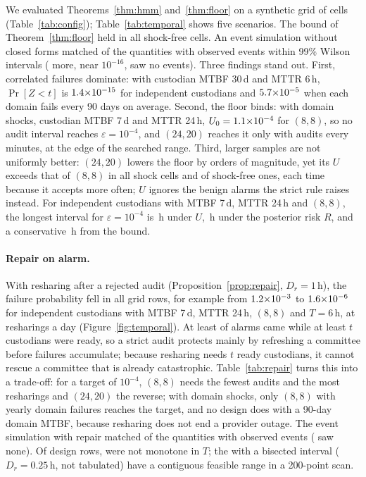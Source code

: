 \documentclass[Crown,sagev]{sagej}
\theoremstyle{plain}
\theoremstyle{definition}
\theoremstyle{remark}
\begin{document}
We evaluated Theorems~\ref{thm:hmm} and~\ref{thm:floor} on a synthetic grid of \TmpGridCells{} cells (Table~\ref{tab:config}); Table~\ref{tab:temporal} shows five scenarios. The bound of Theorem~\ref{thm:floor} held in all \TmpBoundCells{} shock-free cells. An event simulation without closed forms matched \TmpSimInfoPass{} of the \TmpSimInfo{} quantities with observed events within 99\% Wilson intervals (\TmpSimVacuous{} more, near $10^{-16}$, saw no events). Three findings stand out. First, correlated failures dominate: with custodian MTBF 30\,d and MTTR 6\,h, $\Pr[Z<t]$ is $1.4{\times}10^{-15}$ for independent custodians and $5.7{\times}10^{-5}$ when each domain fails every 90 days on average. Second, the floor binds: with domain shocks, custodian MTBF 7\,d and MTTR 24\,h, $U_0=1.1{\times}10^{-4}$ for $(8,8)$, so no audit interval reaches $\varepsilon=10^{-4}$, and $(24,20)$ reaches it only with audits every \TmpHardWideMin{} minutes, at the edge of the searched range. Third, larger samples are not uniformly better: $(24,20)$ lowers the floor by orders of magnitude, yet its $U$ exceeds that of $(8,8)$ in all \TmpShockTotal{} shock cells and \TmpIidWorse{} of \TmpIidTotal{} shock-free ones, each time because it accepts more often; $U$ ignores the benign alarms the strict rule raises instead. For independent custodians with MTBF 7\,d, MTTR 24\,h and $(8,8)$, the longest interval for $\varepsilon=10^{-4}$ is \TmpExactIntervalIID\,h under $U$, \TmpPostIntervalIID\,h under the posterior risk $R$, and a conservative \TmpBoundIntervalIID\,h from the bound.

\paragraph{Repair on alarm.} With resharing after a rejected audit (Proposition~\ref{prop:repair}, $D_r=1$\,h), the failure probability fell in all \RepLowered{} grid rows, for example from $1.2{\times}10^{-3}$ to $1.6{\times}10^{-6}$ for independent custodians with MTBF 7\,d, MTTR 24\,h, $(8,8)$ and $T=6$\,h, at \RepIIDSixPerDay{} resharings a day (Figure~\ref{fig:temporal}). At least \RepBenignMin{} of alarms came while at least $t$ custodians were ready, so a strict audit protects mainly by refreshing a committee before failures accumulate; because resharing needs $t$ ready custodians, it cannot rescue a committee that is already catastrophic. Table~\ref{tab:repair} turns this into a trade-off: for a target of $10^{-4}$, $(8,8)$ needs the fewest audits and the most resharings and $(24,20)$ the reverse; with domain shocks, only $(8,8)$ with yearly domain failures reaches the target, and no design does with a 90-day domain MTBF, because resharing does not end a provider outage. The event simulation with repair matched \RepSimInfoPass{} of the \RepSimInfo{} quantities with observed events (\RepSimVacuous{} saw none). Of \RepDesignRows{} design rows, \RepNonMono{} were not monotone in $T$; the \RepNonMonoBisected{} with a bisected interval ($D_r=0.25$\,h, not tabulated) have a contiguous feasible range in a 200-point scan.
\end{document}
